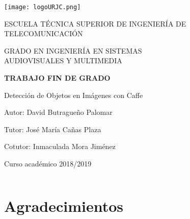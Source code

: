 \documentclass[a4paper, 12pt, oneside]{book}
\begin{document}
\begin{titlepage}
	\begin{center}
		\vspace*{3mm}
		\begin{center}
			\texttt{[image: logoURJC.png]}
		\end{center}
		\vspace{6.5mm}
		
		\fontsize{15.5}{14}\selectfont ESCUELA TÉCNICA SUPERIOR DE INGENIERÍA DE TELECOMUNICACIÓN
		\vspace{13mm}
		
		\fontsize{14}{14}\selectfont GRADO EN INGENIERÍA EN SISTEMAS \\ AUDIOVISUALES Y MULTIMEDIA
		
		\vspace{70pt}
		
		\fontsize{15.7}{14}\selectfont \textbf{TRABAJO FIN DE GRADO} 
		
		\vspace{25mm}
		\begin{huge}
			Detección de Objetos en Imágenes con Caffe
		\end{huge}
		
		\vspace{25mm}
		
		\begin{large}
			Autor: David Butragueño Palomar
			
			Tutor:  José María Cañas Plaza
			
			Cotutor: Inmaculada Mora Jiménez
			
			\vspace{10mm}
		\end{large}
		\begin{normalsize}
			Curso académico 2018/2019		
		\end{normalsize}
		\vspace{10mm}
		
	\end{center}
	
\end{titlepage}

\newpage
$\ $
\thispagestyle{empty} 

\chapter*{Agradecimientos} %
\thispagestyle{empty}
\end{document}
